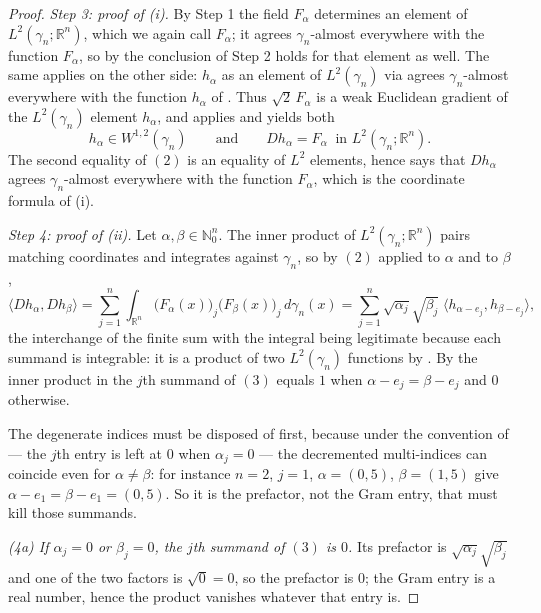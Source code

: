 \begin{proof}
\emph{Step 3: proof of (i).}
By Step 1 the field $F_\alpha$ determines an element of
$L^2(\gamma_n;\mathbb{R}^n)$, which we again call $F_\alpha$; it agrees
$\gamma_n$-almost everywhere with the function $F_\alpha$, so by
 the conclusion of Step 2 holds for that element as
well.  The same applies on the other side: $h_\alpha$ as an element of
$L^2(\gamma_n)$ via  agrees $\gamma_n$-almost everywhere with
the function $h_\alpha$ of .  Thus $\sqrt2\,F_\alpha$ is a
weak Euclidean gradient of the $L^2(\gamma_n)$ element $h_\alpha$, and
 applies and yields both
\begin{equation*}
  h_\alpha \in W^{1,2}(\gamma_n)
  \qquad\text{and}\qquad
  D h_\alpha = F_\alpha \ \text{ in } L^2(\gamma_n;\mathbb{R}^n). \tag{2}
\end{equation*}
The second equality of $(2)$ is an equality of $L^2$ elements, hence says that
$Dh_\alpha$ agrees $\gamma_n$-almost everywhere with the function $F_\alpha$,
which is the coordinate formula of (i).

\emph{Step 4: proof of (ii).}
Let $\alpha,\beta \in \mathbb{N}_0^n$.  The inner product of
$L^2(\gamma_n;\mathbb{R}^n)$ pairs matching coordinates and integrates against
$\gamma_n$, so by $(2)$ applied to $\alpha$ and to $\beta$,
\begin{equation*}
  \langle Dh_\alpha, Dh_\beta\rangle
    = \sum_{j=1}^n \int_{\mathbb{R}^n}
        \bigl(F_\alpha(x)\bigr)_j \bigl(F_\beta(x)\bigr)_j \, d\gamma_n(x)
    = \sum_{j=1}^n \sqrt{\alpha_j}\sqrt{\beta_j}\;
        \langle h_{\alpha-e_j}, h_{\beta-e_j}\rangle , \tag{3}
\end{equation*}
the interchange of the finite sum with the integral being legitimate because each
summand is integrable: it is a product of two $L^2(\gamma_n)$ functions by
.  By  the inner product in
the $j$th summand of $(3)$ equals $1$ when $\alpha - e_j = \beta - e_j$ and $0$
otherwise.

The degenerate indices must be disposed of first, because under the convention of
 --- the $j$th entry is left at $0$ when $\alpha_j = 0$ ---
the decremented multi-indices can coincide even for $\alpha \neq \beta$: for
instance $n = 2$, $j = 1$, $\alpha = (0,5)$, $\beta = (1,5)$ give
$\alpha - e_1 = \beta - e_1 = (0,5)$.  So it is the prefactor, not the Gram entry,
that must kill those summands.

\emph{(4a) If $\alpha_j = 0$ or $\beta_j = 0$, the $j$th summand of $(3)$ is $0$.}
Its prefactor is $\sqrt{\alpha_j}\sqrt{\beta_j}$ and one of the two factors is
$\sqrt{0} = 0$, so the prefactor is $0$; the Gram entry is a real number, hence the
product vanishes whatever that entry is.


\end{proof}
